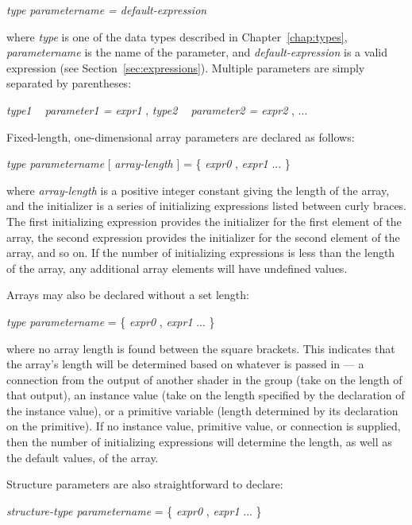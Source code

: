 \documentclass[11pt,letterpaper]{book}
\begin{document}
\medskip
\spc \emph{type parametername = default-expression} 
\medskip

\noindent where \emph{type} is one of the data types described
in Chapter~\ref{chap:types}, \emph{parametername} is the name of the
parameter, and \emph{default-expression} is a valid expression
(see Section~\ref{sec:expressions}).  Multiple parameters are 
simply separated by parentheses:

\medskip
\spc \emph{type1 ~ parameter1 = expr1} {\cf ,} \emph{type2 ~ parameter2 = expr2} {\cf ,} ...
\medskip


Fixed-length, one-dimensional array parameters are declared as follows:

\medskip
\spc \emph{type parametername} {\cf [ } \emph{array-length} {\cf ] = \{ } \emph{expr0}
  {\cf ,} \emph{expr1} ... {\cf \} }
\medskip

\noindent where \emph{array-length} is a positive integer constant
giving the length of the array, and the initializer is a series of
initializing expressions listed between curly braces.  The first
initializing expression provides the initializer for the first element
of the array, the second expression provides the initializer for the
second element of the array, and so on.  If the number of initializing
expressions is less than the length of the array, any additional array
elements will have undefined values.

Arrays may also be declared without a set length:

\medskip
\spc \emph{type parametername} {\cf [ ] = \{ } \emph{expr0}
  {\cf ,} \emph{expr1} ... {\cf \} }
\medskip

\noindent where no array length is found between the square brackets.
This indicates that the array's length will be determined based on
whatever is passed in --- a connection from the output of another shader
in the group (take on the length of that output), an instance value
(take on the length specified by the declaration of the instance value),
or a primitive variable (length determined by its declaration on the
primitive).  If no instance value, primitive value, or connection is
supplied, then the number of initializing expressions will determine the
length, as well as the default values, of the array.

Structure parameters are also straightforward to declare:

\medskip
\spc \emph{structure-type parametername} {\cf = \{ } \emph{expr0}
  {\cf ,} \emph{expr1} ... {\cf \} }
\medskip
\end{document}
